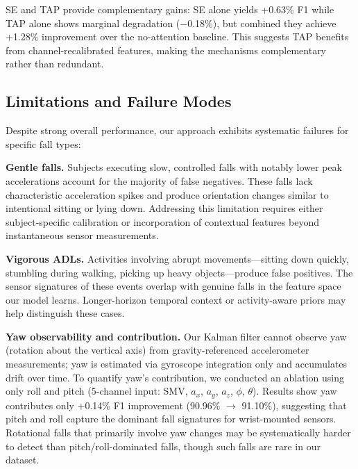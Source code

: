 SE and TAP provide complementary gains: SE alone yields +0.63\% F1 while TAP alone shows marginal degradation ($-$0.18\%), but combined they achieve +1.28\% improvement over the no-attention baseline. This suggests TAP benefits from channel-recalibrated features, making the mechanisms complementary rather than redundant.

\subsection{Limitations and Failure Modes}
\label{subsec:limitations}

Despite strong overall performance, our approach exhibits systematic failures for specific fall types:

\textbf{Gentle falls.} Subjects executing slow, controlled falls with notably lower peak accelerations account for the majority of false negatives. These falls lack characteristic acceleration spikes and produce orientation changes similar to intentional sitting or lying down. Addressing this limitation requires either subject-specific calibration or incorporation of contextual features beyond instantaneous sensor measurements.

\textbf{Vigorous ADLs.} Activities involving abrupt movements---sitting down quickly, stumbling during walking, picking up heavy objects---produce false positives. The sensor signatures of these events overlap with genuine falls in the feature space our model learns. Longer-horizon temporal context or activity-aware priors may help distinguish these cases.

\textbf{Yaw observability and contribution.} Our Kalman filter cannot observe yaw (rotation about the vertical axis) from gravity-referenced accelerometer measurements; yaw is estimated via gyroscope integration only and accumulates drift over time. To quantify yaw's contribution, we conducted an ablation using only roll and pitch (5-channel input: SMV, $a_x$, $a_y$, $a_z$, $\phi$, $\theta$). Results show yaw contributes only +0.14\% F1 improvement (90.96\% $\rightarrow$ 91.10\%), suggesting that pitch and roll capture the dominant fall signatures for wrist-mounted sensors. Rotational falls that primarily involve yaw changes may be systematically harder to detect than pitch/roll-dominated falls, though such falls are rare in our dataset.


